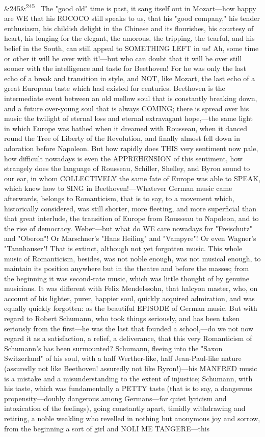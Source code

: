 \documentclass[12pt]{article}
\newcommand{\para}[1][]{\par\noindent\ifx&#1&\else\textsuperscript{\footnotesize #1}~\fi}
\begin{document}
\para[245] The "good old" time is past, it sang itself out in Mozart---how happy are WE that his ROCOCO still speaks to us, that his "good company," his tender enthusiasm, his childish delight in the Chinese and its flourishes, his courtesy of heart, his longing for the elegant, the amorous, the tripping, the tearful, and his belief in the South, can still appeal to SOMETHING LEFT in us! Ah, some time or other it will be over with it!---but who can doubt that it will be over still sooner with the intelligence and taste for Beethoven! For he was only the last echo of a break and transition in style, and NOT, like Mozart, the last echo of a great European taste which had existed for centuries. Beethoven is the intermediate event between an old mellow soul that is constantly breaking down, and a future over-young soul that is always COMING; there is spread over his music the twilight of eternal loss and eternal extravagant hope,---the same light in which Europe was bathed when it dreamed with Rousseau, when it danced round the Tree of Liberty of the Revolution, and finally almost fell down in adoration before Napoleon. But how rapidly does THIS very sentiment now pale, how difficult nowadays is even the APPREHENSION of this sentiment, how strangely does the language of Rousseau, Schiller, Shelley, and Byron sound to our ear, in whom COLLECTIVELY the same fate of Europe was able to SPEAK, which knew how to SING in Beethoven!---Whatever German music came afterwards, belongs to Romanticism, that is to say, to a movement which, historically considered, was still shorter, more fleeting, and more superficial than that great interlude, the transition of Europe from Rousseau to Napoleon, and to the rise of democracy. Weber---but what do WE care nowadays for "Freischutz" and "Oberon"! Or Marschner's "Hans Heiling" and "Vampyre"! Or even Wagner's "Tannhauser"! That is extinct, although not yet forgotten music. This whole music of Romanticism, besides, was not noble enough, was not musical enough, to maintain its position anywhere but in the theatre and before the masses; from the beginning it was second-rate music, which was little thought of by genuine musicians. It was different with Felix Mendelssohn, that halcyon master, who, on account of his lighter, purer, happier soul, quickly acquired admiration, and was equally quickly forgotten: as the beautiful EPISODE of German music. But with regard to Robert Schumann, who took things seriously, and has been taken seriously from the first---he was the last that founded a school,---do we not now regard it as a satisfaction, a relief, a deliverance, that this very Romanticism of Schumann's has been surmounted? Schumann, fleeing into the "Saxon Switzerland" of his soul, with a half Werther-like, half Jean-Paul-like nature (assuredly not like Beethoven! assuredly not like Byron!)---his MANFRED music is a mistake and a misunderstanding to the extent of injustice; Schumann, with his taste, which was fundamentally a PETTY taste (that is to say, a dangerous propensity---doubly dangerous among Germans---for quiet lyricism and intoxication of the feelings), going constantly apart, timidly withdrawing and retiring, a noble weakling who revelled in nothing but anonymous joy and sorrow, from the beginning a sort of girl and NOLI ME TANGERE---this 
\end{document}
